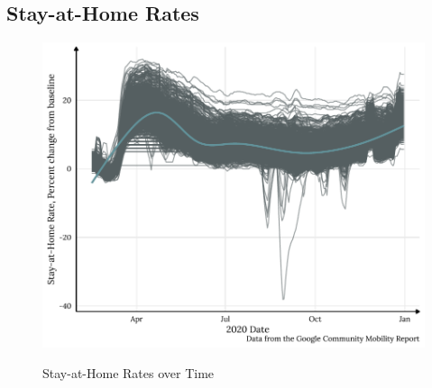 \hypertarget{stay-at-home-rates}{\subsection{Stay-at-Home Rates}\label{stay-at-home-rates}}



\begin{figure}
{\centering \includegraphics[width=0.8\linewidth]{figs/paper3/plot-google-1}}
\caption{Stay-at-Home Rates over Time}\label{fig:plot-google}
\end{figure}

